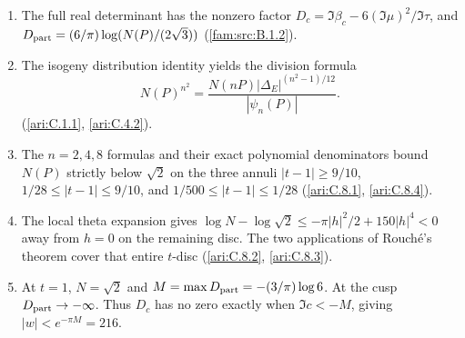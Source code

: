 \RungOne
\begin{enumerate}[label=\arabic*.]
\item The full real determinant has the nonzero factor
$D_c=\Im\beta_c-6(\Im\mu)^2/\Im\tau$, and
$D_{\rm part}=(6/\pi)\log(N(P)/(2\sqrt3))$
(\ref{fam:src:B.1.2}).
\item The isogeny distribution identity yields the division formula
\[
N(P)^{n^2}=\frac{N(nP)|\Delta_E|^{(n^2-1)/12}}{|\psi_n(P)|}.
\]
(\ref{ari:C.1.1}, \ref{ari:C.4.2}).
\item The $n=2,4,8$ formulas and their exact polynomial denominators
bound $N(P)$ strictly below $\sqrt2$ on the three annuli
$|t-1|\ge9/10$, $1/28\le|t-1|\le9/10$, and
$1/500\le|t-1|\le1/28$
(\ref{ari:C.8.1}, \ref{ari:C.8.4}).
\item The local theta expansion gives
$\log N-\log\sqrt2\le-\pi|h|^2/2+150|h|^4<0$
away from $h=0$ on the remaining disc. The two applications of
Rouch\'e's theorem cover that entire $t$-disc
(\ref{ari:C.8.2}, \ref{ari:C.8.3}).
\item At $t=1$, $N=\sqrt2$ and
$M=\max D_{\rm part}=-(3/\pi)\log6$.
At the cusp $D_{\rm part}\to-\infty$. Thus $D_c$ has no zero exactly
when $\Im c<-M$, giving $|w|<e^{-\pi M}=216$.
\end{enumerate}

